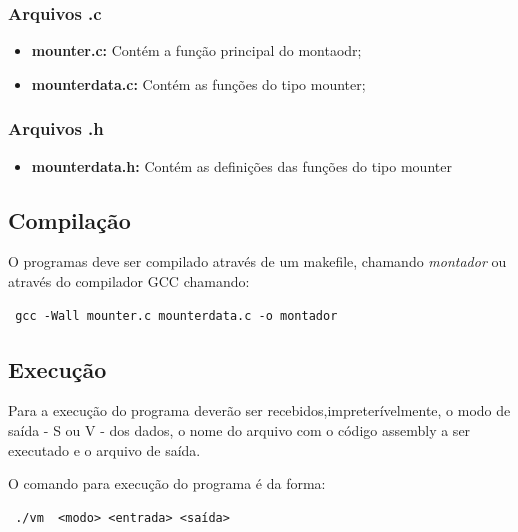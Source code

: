 \documentclass[12pt]{article}
\begin{document}
\subsubsection{Arquivos .c}
\begin{itemize}
\item \textbf{mounter.c:} Contém a função principal do montaodr;
\item \textbf{mounterdata.c:} Contém as funções do tipo mounter;
\end{itemize}

\subsubsection{Arquivos .h}

\begin{itemize}
\item \textbf{mounterdata.h:} Contém as definições das funções do tipo mounter
\end{itemize}

\subsection{Compilação}

O programas deve ser compilado através de um makefile, chamando
\textit{montador}
ou através do compilador GCC chamando:\\

\begin{footnotesize}
\begin{verbatim} gcc -Wall mounter.c mounterdata.c -o montador \end{verbatim}
\end{footnotesize}

\subsection{Execução}

Para a execução do programa deverão ser recebidos,impreterívelmente, 
o modo de saída - S ou V - dos dados, o nome do arquivo com o código assembly a ser
executado e o arquivo de saída.

O comando para execução do programa é da forma: \\

\begin{footnotesize}
\begin{verbatim} ./vm  <modo> <entrada> <saída> \end{verbatim}
\end{footnotesize}
\end{document}
